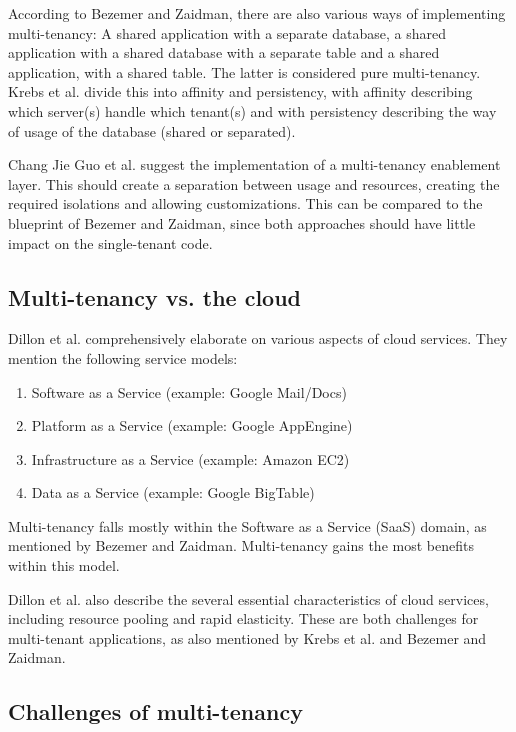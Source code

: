 According to Bezemer and Zaidman\cite{bezemer2010multi}, there are also various ways of implementing multi-tenancy: A shared application with a separate database, a shared application with a shared database with a separate table and a shared application, with a shared table. The latter is considered pure multi-tenancy. Krebs et al.\cite{krebs2012architecture} divide this into affinity and persistency, with affinity describing which server(s) handle which tenant(s) and with persistency describing the way of usage of the database (shared or separated).

Chang Jie Guo et al.\cite{guo2007framework} suggest the implementation of a multi-tenancy enablement layer. This should create a separation between usage and resources, creating the required isolations and allowing customizations. This can be compared to the blueprint of Bezemer and Zaidman\cite{bezemer2010multi}, since both approaches should have little impact on the single-tenant code.

\subsection{Multi-tenancy vs. the cloud}

Dillon et al.\cite{dillon2010cloud} comprehensively elaborate on various aspects of cloud services. They mention the following service models: 
\begin{enumerate}
\item Software as a Service (example: Google Mail/Docs)
\item Platform as a Service (example: Google AppEngine)
\item Infrastructure as a Service (example: Amazon EC2)
\item Data as a Service (example: Google BigTable)
\end{enumerate}

Multi-tenancy falls mostly within the Software as a Service (SaaS) domain, as mentioned by Bezemer and Zaidman\cite{bezemer2010multi}. Multi-tenancy gains the most benefits within this model.

Dillon et al.\cite{dillon2010cloud} also describe the several essential characteristics of cloud services, including resource pooling and rapid elasticity. These are both challenges for multi-tenant applications, as also mentioned by Krebs et al.\cite{krebs2012architecture} and Bezemer and Zaidman\cite{bezemer2010multi}.

\subsection{Challenges of multi-tenancy}

